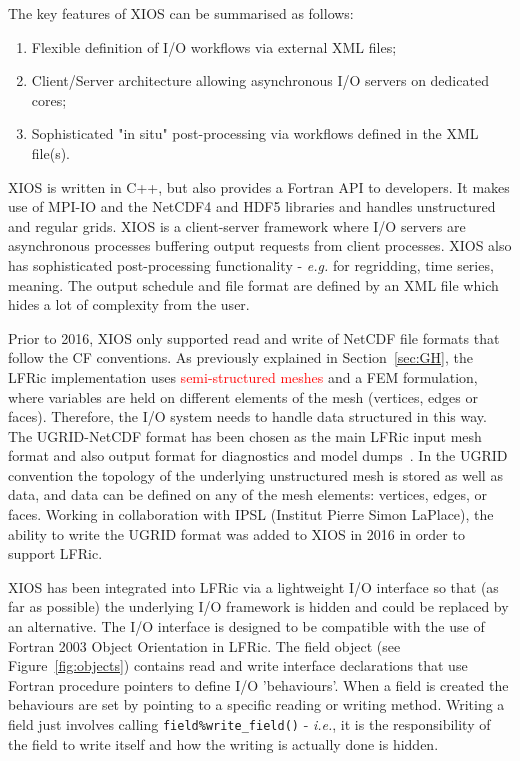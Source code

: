 \documentclass[review,times]{elsarticle}
\begin{document}
The key features of XIOS can be summarised as follows:
\begin{enumerate}
  \item Flexible definition of I/O workflows via external XML files;
  \item Client/Server architecture allowing asynchronous I/O servers on dedicated cores;
  \item Sophisticated "in situ" post-processing via workflows defined in the XML file(s). 
\end{enumerate}

XIOS is written in C++, but also provides a Fortran API to developers. It makes use of
MPI-IO and the NetCDF4 and HDF5 libraries and handles unstructured and regular grids.
XIOS is a client-server framework where I/O servers are asynchronous processes buffering
output requests from client processes. XIOS also has sophisticated post-processing
functionality - {\em e.g.} for regridding, time series, meaning. The output schedule and
file format are defined by an XML file which hides a lot of complexity from the user.

Prior to 2016, XIOS only supported read and write of NetCDF file formats that follow the CF
conventions.  As previously explained in Section~\ref{sec:GH}, the LFRic implementation uses
\textcolor{red}{semi-structured meshes} and a FEM formulation, where variables are held on
different elements of the mesh (vertices, edges or faces). Therefore, the I/O system needs to
handle data structured in this way. The UGRID-NetCDF format has been chosen as the main
LFRic input mesh format and also output format for diagnostics and model dumps~\cite{UgridSpec}.
In the UGRID convention the topology of the underlying unstructured mesh is stored as well as
data, and data can be defined on any of the mesh elements: vertices, edges, or faces.
Working in collaboration with IPSL (Institut Pierre Simon LaPlace), the ability to write the
UGRID format was added to XIOS in 2016 in order to support LFRic. 

XIOS has been integrated into LFRic via a lightweight I/O interface so
that (as far as possible) the underlying I/O framework is hidden and
could be replaced by an alternative.  The I/O interface is designed to
be compatible with the use of Fortran 2003 Object Orientation in
LFRic. The field object (see Figure~\ref{fig:objects}) contains read and write
interface declarations that use Fortran procedure pointers to define
I/O 'behaviours'. When a field is created the behaviours are set by
pointing to a specific reading or writing method. Writing a field just
involves calling \verb+field%write_field()+ - {\em i.e.}, it is the
responsibility of the field to write itself and how the writing is
actually done is hidden.
\end{document}
